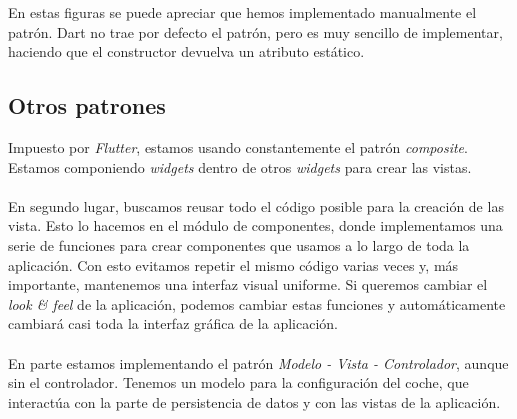 En estas figuras se puede apreciar que hemos implementado manualmente el patrón. Dart no trae por defecto el patrón, pero es muy sencillo de implementar, haciendo que el constructor devuelva un atributo estático.

\newpage

\subsection{Otros patrones}

Impuesto por \emph{Flutter}, estamos usando constantemente el patrón \emph{composite}. Estamos componiendo \emph{widgets} dentro de otros \emph{widgets} para crear las vistas.
\\\\
En segundo lugar, buscamos reusar todo el código posible para la creación de las vista. Esto lo hacemos en el módulo de componentes, donde implementamos una serie de funciones para crear componentes que usamos a lo largo de toda la aplicación. Con esto evitamos repetir el mismo código varias veces y, más importante, mantenemos una interfaz visual uniforme. Si queremos cambiar el \emph{look \& feel} de la aplicación, podemos cambiar estas funciones y automáticamente cambiará casi toda la interfaz gráfica de la aplicación.
\\\\
En parte estamos implementando el patrón \emph{Modelo - Vista - Controlador}, aunque sin el controlador. Tenemos un modelo para la configuración del coche, que interactúa con la parte de persistencia de datos y con las vistas de la aplicación.






